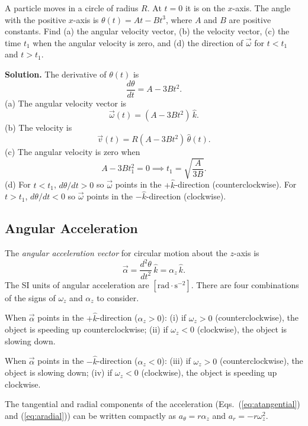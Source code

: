 \begin{workedexample}
A particle moves in a circle of radius $R$. At $t = 0$ it is on the $x$-axis. The angle with the positive $x$-axis is $\theta(t) = At - Bt^3$, where $A$ and $B$ are positive constants. Find (a) the angular velocity vector, (b) the velocity vector, (c) the time $t_1$ when the angular velocity is zero, and (d) the direction of $\vec{\omega}$ for $t < t_1$ and $t > t_1$.

\noindent\textbf{Solution.} The derivative of $\theta(t)$ is
\[
    \frac{d\theta}{dt} = A - 3Bt^2.
\]
(a) The angular velocity vector is
\[
    \vec{\omega}(t) = (A - 3Bt^2)\,\hat{k}.
\]
(b) The velocity is
\[
    \vec{v}(t) = R(A - 3Bt^2)\,\hat{\theta}(t).
\]
(c) The angular velocity is zero when
\[
    A - 3Bt_1^2 = 0 \implies t_1 = \sqrt{\frac{A}{3B}}.
\]
(d) For $t < t_1$, $d\theta/dt > 0$ so $\vec{\omega}$ points in the $+\hat{k}$-direction (counterclockwise). For $t > t_1$, $d\theta/dt < 0$ so $\vec{\omega}$ points in the $-\hat{k}$-direction (clockwise).
\end{workedexample}

\subsection{Angular Acceleration}

The \textit{angular acceleration vector} for circular motion about the $z$-axis is
\begin{equation}
    \vec{\alpha} = \frac{d^2\theta}{dt^2}\,\hat{k} = \alpha_z\,\hat{k}.
\end{equation}
The SI units of angular acceleration are $[\mathrm{rad\cdot s^{-2}}]$. There are four combinations of the signs of $\omega_z$ and $\alpha_z$ to consider.

When $\vec{\alpha}$ points in the $+\hat{k}$-direction ($\alpha_z > 0$): (i) if $\omega_z > 0$ (counterclockwise), the object is speeding up counterclockwise; (ii) if $\omega_z < 0$ (clockwise), the object is slowing down.

When $\vec{\alpha}$ points in the $-\hat{k}$-direction ($\alpha_z < 0$): (iii) if $\omega_z > 0$ (counterclockwise), the object is slowing down; (iv) if $\omega_z < 0$ (clockwise), the object is speeding up clockwise.

The tangential and radial components of the acceleration (Eqs.~(\ref{eq:atangential}) and (\ref{eq:aradial})) can be written compactly as $a_\theta = r\alpha_z$ and $a_r = -r\omega_z^2$.

